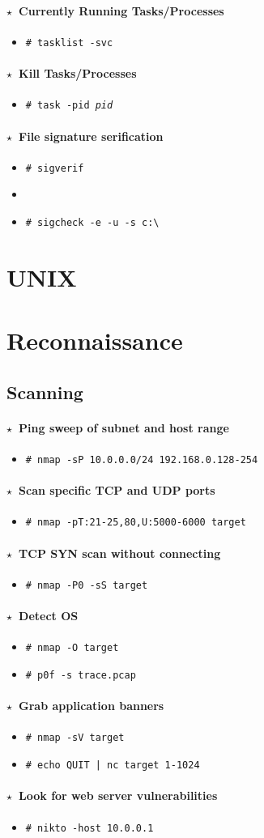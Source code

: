 \documentclass[10pt,landscape]{article}
\newcommand{\os}[1]{\texttt{\footnotesize{#1}}}
\newcommand{\unix}{\os{U}}
\newcommand{\windows}{\os{W}}
\newenvironment{action}[1]
  {\paragraph{$\star$~#1}\begin{itemize}[leftmargin=1cm]}
  {\end{itemize}}
\newcommand{\cmd}[2]{\item[#1] {\small\tt\# #2}}
\newcommand{\tool}[2]{\item[#1] {\footnotesize\sc{#2}}\xspace}
\begin{document}
\begin{multicols*}{3}
\begin{action}{Currently Running Tasks/Processes}
\cmd{\windows}{tasklist -svc}
\end{action}

\begin{action}{Kill Tasks/Processes}
\cmd{\windows}{task -pid \emph{pid}}
\end{action}

\begin{action}{File signature serification}
\cmd{\windows}{sigverif}
\tool{\windows}{sigcheck}
\cmd{\windows}{sigcheck -e -u -s c:{\textbackslash} }
\end{action}

\section*{UNIX}

\section*{Reconnaissance}

\subsection*{Scanning}

\begin{action}{Ping sweep of subnet and host range}
\cmd{\unix}{nmap -sP 10.0.0.0/24 192.168.0.128-254}
\end{action}

\begin{action}{Scan specific TCP and UDP ports}
\cmd{\unix}{nmap -pT:21-25,80,U:5000-6000 target}
\end{action}

\begin{action}{TCP SYN scan without connecting}
\cmd{\unix}{nmap -P0 -sS target}
\end{action}

\begin{action}{Detect OS}
\cmd{\unix}{nmap -O target}
\cmd{\unix}{p0f -s trace.pcap}
\end{action}

\begin{action}{Grab application banners}
\cmd{\unix}{nmap -sV target}
\cmd{\unix}{echo QUIT | nc target 1-1024}
\end{action}

\begin{action}{Look for web server vulnerabilities}
\cmd{\unix}{nikto -host 10.0.0.1}
\end{action}


\end{multicols*}
\end{document}

